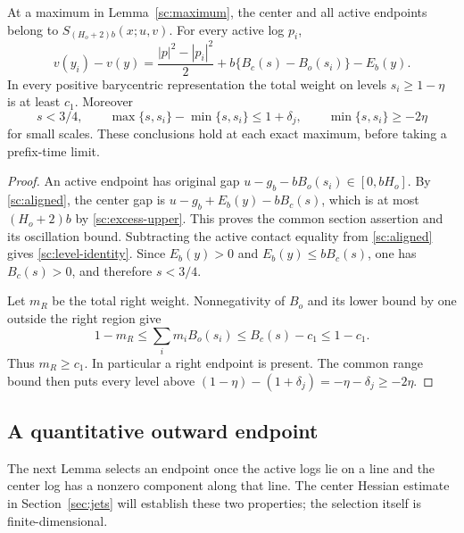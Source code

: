 \begin{lemma}\label{sc:levels}
At a maximum in Lemma~\ref{sc:maximum}, the center and all active
endpoints belong to $S_{(H_o+2)b}(x;u,v)$.
For every active log $p_i$,
\begin{equation}
 v(y_i)-v(y)=\frac{|p|^2-|p_i|^2}{2}
          +b\{B_c(s)-B_o(s_i)\}-E_b(y).
 \label{sc:level-identity}
\end{equation}
In every positive barycentric representation the total weight on
levels $s_i\geq1-\eta$ is at least $c_1$.
Moreover
\begin{equation}
 s<3/4,\qquad
 \max\{s,s_i\}-\min\{s,s_i\}\leq1+\delta_j,\qquad
 \min\{s,s_i\}\geq-2\eta
 \label{sc:level-bounds}
\end{equation}
for small scales.  These conclusions hold at each exact maximum,
before taking a prefix-time limit.
\end{lemma}

\begin{proof}
An active endpoint has original gap
$u-g_b-bB_o(s_i)\in[0,bH_o]$.
By \eqref{sc:aligned}, the center gap is
$u-g_b+E_b(y)-bB_c(s)$, which is at most $(H_o+2)b$ by
\eqref{sc:excess-upper}.  This proves the common section assertion
and its oscillation bound.  Subtracting the active contact equality
from \eqref{sc:aligned} gives \eqref{sc:level-identity}.
Since $E_b(y)>0$ and $E_b(y)\leq bB_c(s)$, one has $B_c(s)>0$,
and therefore $s<3/4$.

Let $m_R$ be the total right weight.  Nonnegativity of $B_o$ and its
lower bound by one outside the right region give
\[
 1-m_R\leq\sum_i m_iB_o(s_i)\leq B_c(s)-c_1\leq1-c_1.
\]
Thus $m_R\geq c_1$.  In particular a right endpoint is present.
The common range bound then puts every level above
$(1-\eta)-(1+\delta_j)=-\eta-\delta_j\geq-2\eta$.
\end{proof}

\subsection{A quantitative outward endpoint}

The next Lemma selects an endpoint once the active logs lie on a line
and the center log has a nonzero component along that line.
The center Hessian estimate in Section~\ref{sec:jets} will establish
these two properties; the selection itself is finite-dimensional.

